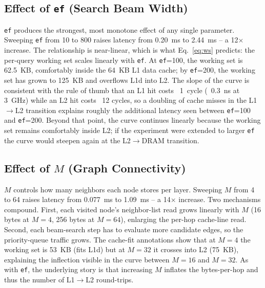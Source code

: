 \documentclass[conference]{IEEEtran}
\begin{document}
\subsection{Effect of \texttt{ef} (Search Beam Width)}
\texttt{ef} produces the strongest, most monotone effect of any single
parameter. Sweeping \texttt{ef} from 10 to 800 raises latency from
0.20~ms to 2.44~ms -- a 12$\times$ increase. The relationship is
near-linear, which is what Eq.~\eqref{eq:ws} predicts: the per-query
working set scales linearly with \texttt{ef}. At \texttt{ef}=100, the
working set is 62.5~KB, comfortably inside the 64~KB L1 data cache; by
\texttt{ef}=200, the working set has grown to 125~KB and overflows L1d
into L2. The slope of the curve is consistent with the rule of thumb
that an L1 hit costs ~1~cycle (~0.3~ns at 3~GHz) while an L2 hit costs
~12 cycles, so a doubling of cache misses in the L1$\rightarrow$L2
transition explains roughly the additional latency seen between
\texttt{ef}=100 and \texttt{ef}=200. Beyond that point, the curve
continues linearly because the working set remains comfortably inside
L2; if the experiment were extended to larger \texttt{ef} the curve
would steepen again at the L2$\rightarrow$DRAM transition.

\subsection{Effect of $M$ (Graph Connectivity)}
$M$ controls how many neighbors each node stores per layer. Sweeping $M$
from 4 to 64 raises latency from 0.077~ms to 1.09~ms -- a 14$\times$
increase. Two mechanisms compound. First, each visited node's
neighbor-list read grows linearly with $M$ (16 bytes at $M=4$, 256 bytes
at $M=64$), enlarging the per-hop cache-line read. Second, each beam-search
step has to evaluate more candidate edges, so the priority-queue traffic
grows. The cache-fit annotations show that at $M=4$ the working set is
53~KB (fits L1d) but at $M=32$ it crosses into L2 (75~KB), explaining the
inflection visible in the curve between $M=16$ and $M=32$. As with
\texttt{ef}, the underlying story is that increasing $M$ inflates the
bytes-per-hop and thus the number of L1$\rightarrow$L2 round-trips.
\end{document}
